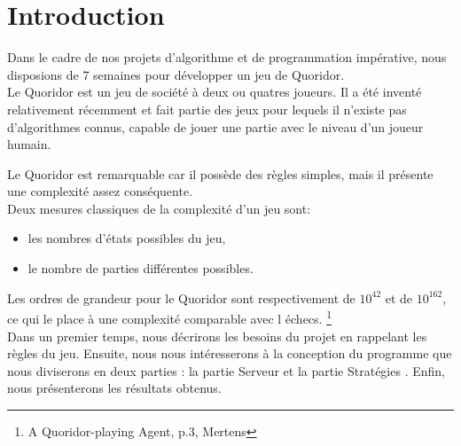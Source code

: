 \section*{Introduction}

Dans le cadre de nos projets d'algorithme et de programmation 
impérative, nous disposions de 7 semaines pour développer un
jeu de Quoridor.\\

Le Quoridor est un jeu de société à deux ou quatres joueurs. Il a été inventé 
relativement récemment et fait partie des jeux pour lequels il n'existe pas 
d'algorithmes connus, capable de jouer une partie avec le niveau d'un joueur 
humain.

Le Quoridor est remarquable car il possède des règles simples, mais il présente 
une complexité assez conséquente.\\
Deux mesures classiques de la complexité d'un jeu sont:
\begin{itemize}
  \item les nombres d'états possibles du jeu,
  \item le nombre de parties différentes possibles.
\end{itemize}
Les ordres de grandeur pour le Quoridor sont respectivement de $10^{42}$ et de 
$10^{162}$, ce qui le place à une complexité comparable avec l échecs.  
\footnote{A Quoridor-playing Agent, p.3, Mertens}\\

Dans un premier temps, nous décrirons les besoins du projet en rappelant les 
règles du jeu. Ensuite, nous nous intéresserons à la conception du programme
que nous diviserons en deux parties : la partie \og Serveur \fg{} et la partie 
\og Stratégies \fg{}. Enfin, nous présenterons les résultats obtenus.
